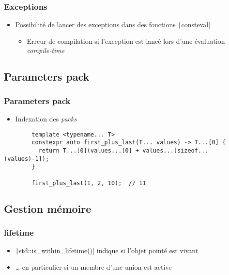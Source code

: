 \documentclass[C++.tex]{subfiles}
\begin{document}
\begin{frame}[fragile]
	\frametitle{Exceptions}
	\begin{itemize}
		\item Possibilité de lancer des exceptions dans des fonctions \texttt|consteval|
		\begin{itemize}
			\item Erreur de compilation si l'exception est lancé lors d'une évaluation \textit{compile-time}
		\end{itemize}
	\end{itemize}

\end{frame}

\subsection*{Parameters pack}
\begin{frame}[fragile]
	\frametitle{Parameters pack}
	\begin{itemize}
		\item Indexation des \textit{packs}
	\end{itemize}

	\begin{verbatim}
		template <typename... T>
		constexpr auto first_plus_last(T... values) -> T...[0] {
		  return T...[0](values...[0] + values...[sizeof...(values)-1]);
		}

		first_plus_last(1, 2, 10);  // 11
	\end{verbatim}

\end{frame}

\subsection*{Gestion mémoire}
\begin{frame}[fragile]
	\frametitle{lifetime}
	\begin{itemize}
		\item \texttt|std::is_within_lifetime()| indique si l'objet pointé est vivant
		\item \ldots{} en particulier si un membre d'une union est active
	\end{itemize}

\end{frame}
\end{document}
